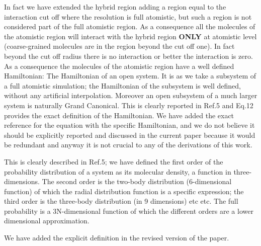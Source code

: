 \documentclass[12pt]{article}
\begin{document}
In fact we have extended the hybrid region adding a region equal to
the interaction cut off where the resolution is full atomistic, but
such a region is not considered part of the full atomistic region. As
a consequence all the molecules of the atomistic region will interact
with the hybrid region {\bf ONLY} at atomistic level (coarse-grained
molecules are in the region beyond the cut off one). In fact beyond
the cut off radius there is no interaction or better the interaction
is zero. As a consequence the molecules of the atomistic region have a
well defined Hamiltonian: The Hamiltonian of an open system.
It is as we take a subsystem of a full atomistic simulation; the Hamiltonian of the subsystem is well defined, without any artificial interpolation.
Moreover an open subsystem of a much larger system is naturally Grand Canonical.
This is clearly reported in Ref.5 and Eq.12 provides the exact definition of the Hamiltonian.
We have added the exact reference for the equation with the specific Hamiltonian, and we do not believe it should be explicitly reported and discussed in the current paper because it would be redundant and anyway it is not crucial to any of the derivations of this work.


{\color{blue}{\it (4) Page 4. ``...reproduce the first order of the
    probability...'' and ``Higher orders...'' Could the authors
    specify what (small) quantity the order is referred to?, I think
    it could be orders in the density of solute molecules, or maybe in
    density variation with respect the average. Please be more clear
    when referring to ``orders'' elsewhere in the manuscript.}}

This is clearly described in Ref.5; we have defined the first order of
the probability distribution of a system as its molecular density, a
function in three-dimensions. The second order is the two-body
distribution (6-dimensional function) of which the radial distribution
function is a specific expression; the third order is the three-body
distribution (in 9 dimensions) etc etc. The full probability is a
3N-dimensional function of which the different orders are a lower
dimensional approximation.

We have added the explicit definition in the revised version of the paper.

{\color{blue}{\it (5) Page 5. Auxiliary Hamiltonian. For the sake of
    clarity, the authors should write down this Hamiltonian they refer
    to, with full index details. Also, please write down the form of
    thermodynamic force in the auxiliary Hamiltonian. They mention
    that simulations using the auxiliary Hamiltonian were made with no
    thermostat. Did the authors check that the ``energy'' of this
    Hamiltonian is conserved? Please comment on this important
    issue.}}
\end{document}
